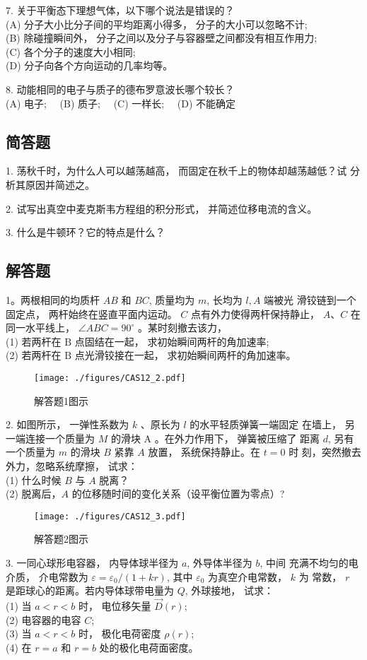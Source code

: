 7. 关于平衡态下理想气体，以下哪个说法是错误的？\\
(A) 分子大小比分子间的平均距离小得多， 分子的大小可以忽略不计;\\
(B) 除碰撞瞬间外， 分子之间以及分子与容器壁之间都没有相互作用力;\\
(C) 各个分子的速度大小相同;\\
(D) 分子向各个方向运动的几率均等。

8. 动能相同的电子与质子的德布罗意波长哪个较长？\\
(A) 电子;$\quad$
(B) 质子;$\quad$
(C) 一样长;$\quad$
(D) 不能确定

\subsection{简答题}

1. 荡秋千时，为什么人可以越荡越高， 而固定在秋千上的物体却越荡越低？试 分析其原因并简述之。

2. 试写出真空中麦克斯韦方程组的积分形式， 并简述位移电流的含义。

3. 什么是牛顿环？它的特点是什么？
\subsection{解答题}
1。两根相同的均质杆 $A B$ 和 $B C$, 质量均为 $m$, 长均为 $l, A$ 端被光 滑铰链到一个固定点， 两杆始终在竖直平面内运动。 $C$ 点有外力使得两杆保持静止， $A $、$ C$ 在同一水平线上， $\angle A B C=90^{\circ}$ 。某时刻撤去该力，\\
(1) 若两杆在 $\mathrm{B}$ 点固结在一起， 求初始瞬间两杆的角加速率;\\
(2) 若两杆在 $\mathrm{B}$ 点光滑铰接在一起， 求初始瞬间两杆的角加速率。
\begin{figure}[ht]
\centering
\texttt{[image: ./figures/CAS12\_2.pdf]}
\caption{解答题1图示} \label{CAS12_fig2}
\end{figure}

2. 如图所示， 一弹性系数为 $k$ 、原长为 $l$ 的水平轻质弹簧一端固定 在墙上， 另一端连接一个质量为 $M$ 的滑块 $\mathrm{A}$ 。在外力作用下， 弹簧被压缩了 距离 $d$, 另有一个质量为 $m$ 的滑块 $B$ 紧靠 $A$ 放置， 系统保持静止。在 $t=0$ 时 刻，突然撤去外力，忽略系统摩擦， 试求：\\
(1) 什么时候 $B$ 与 $A$ 脱离？\\
(2) 脱离后，$A$ 的位移随时间的变化关系（设平衡位置为零点）?
\begin{figure}[ht]
\centering
\texttt{[image: ./figures/CAS12\_3.pdf]}
\caption{解答题2图示} \label{CAS12_fig3}
\end{figure}
3. 一同心球形电容器， 内导体球半径为 $a$, 外导体半径为 $b$, 中间 充满不均匀的电介质， 介电常数为 $\varepsilon=\varepsilon_{0} /(1+k r)$, 其中 $\varepsilon_{0}$ 为真空介电常数， $k$ 为 常数， $r$ 是距球心的距离。若内导体球带电量为 $Q$, 外球接地， 试求：\\
(1) 当 $a<r< b$ 时， 电位移矢量 $\vec{D}(r)$; \\
(2) 电容器的电容 $C$; \\
(3) 当 $a<r< b$ 时， 极化电荷密度 $\rho(r)$; \\
(4) 在 $r=a$ 和 $r=b$ 处的极化电荷面密度。

